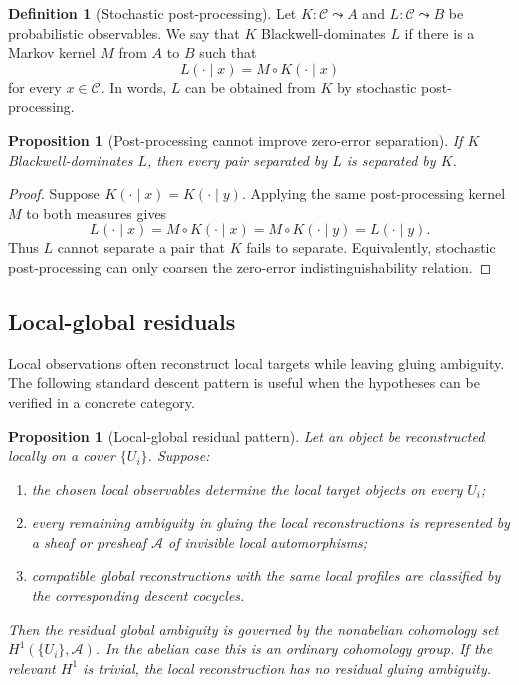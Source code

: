 \documentclass[11pt]{article}
\newtheorem{proposition}[theorem]{Proposition}
\theoremstyle{definition}
\newtheorem{definition}[theorem]{Definition}
\theoremstyle{remark}
\begin{document}
\begin{definition}[Stochastic post-processing]
Let \(K:\mathcal C\leadsto A\) and \(L:\mathcal C\leadsto B\) be probabilistic observables.  We say that \(K\) Blackwell-dominates \(L\) if there is a Markov kernel \(M\) from \(A\) to \(B\) such that
\[
L(\cdot\mid x)=M\circ K(\cdot\mid x)
\]
for every \(x\in\mathcal C\).  In words, \(L\) can be obtained from \(K\) by stochastic post-processing.
\end{definition}

\begin{proposition}[Post-processing cannot improve zero-error separation]
If \(K\) Blackwell-dominates \(L\), then every pair separated by \(L\) is separated by \(K\).
\end{proposition}

\begin{proof}
Suppose \(K(\cdot\mid x)=K(\cdot\mid y)\).  Applying the same post-processing kernel \(M\) to both measures gives
\[
L(\cdot\mid x)=M\circ K(\cdot\mid x)=M\circ K(\cdot\mid y)=L(\cdot\mid y).
\]
Thus \(L\) cannot separate a pair that \(K\) fails to separate.  Equivalently, stochastic post-processing can only coarsen the zero-error indistinguishability relation.
\end{proof}

\subsection{Local-global residuals}

Local observations often reconstruct local targets while leaving gluing ambiguity.  The following standard descent pattern is useful when the hypotheses can be verified in a concrete category.

\begin{proposition}[Local-global residual pattern]
Let an object be reconstructed locally on a cover \(\{U_i\}\).  Suppose:
\begin{enumerate}[label=(\alph*)]
\item the chosen local observables determine the local target objects on every \(U_i\);
\item every remaining ambiguity in gluing the local reconstructions is represented by a sheaf or presheaf \(\mathcal A\) of invisible local automorphisms;
\item compatible global reconstructions with the same local profiles are classified by the corresponding descent cocycles.
\end{enumerate}
Then the residual global ambiguity is governed by the nonabelian cohomology set \(H^1(\{U_i\},\mathcal A)\).  In the abelian case this is an ordinary cohomology group.  If the relevant \(H^1\) is trivial, the local reconstruction has no residual gluing ambiguity.
\end{proposition}
\end{document}
